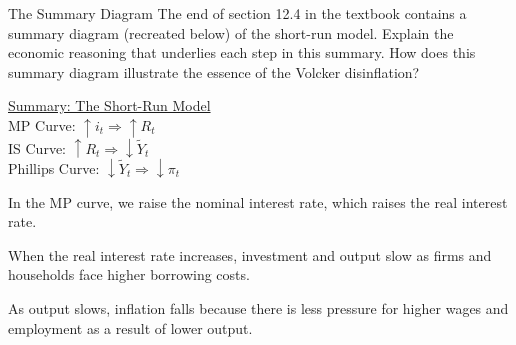 \documentclass[10pt]{extarticle}
\begin{document}
  \begin{problem}{The Summary Diagram}
    The end of section 12.4 in the textbook contains a summary diagram (recreated below) of the short-run model. Explain the economic reasoning that underlies each step in this summary. How does this summary diagram illustrate the essence of the Volcker disinflation?
    \begin{center}
      \underline{Summary: The Short-Run Model}\\
      \vspace{10pt}
      MP Curve: $\uparrow i_t \Rightarrow \uparrow R_t$\\
      \vspace{10pt}
      IS Curve: $\uparrow R_t \Rightarrow \downarrow \tilde{Y}_t$\\
      \vspace{10pt}
      Phillips Curve: $\downarrow \tilde{Y}_t \Rightarrow \downarrow \pi_t$
    \end{center}
    \tcblower
    \begin{description}[font = \normalfont\scshape]
      \item[MP Curve] In the MP curve, we raise the nominal interest rate, which raises the real interest rate.
      \item[IS Curve] When the real interest rate increases, investment and output slow as firms and households face higher borrowing costs.
      \item[Phillips Curve] As output slows, inflation falls because there is less pressure for higher wages and employment as a result of lower output.
    \end{description}
  \end{problem}
\end{document}
